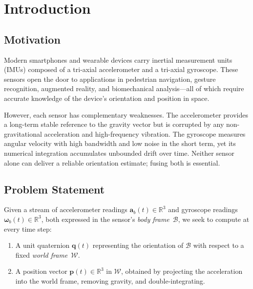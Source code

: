 \section{Introduction}
\label{sec:introduction}


\subsection{Motivation}
\label{sec:intro:motivation}

Modern smartphones and wearable devices carry inertial measurement units (IMUs)
composed of a tri-axial accelerometer and a tri-axial gyroscope. These sensors
open the door to applications in pedestrian navigation, gesture recognition,
augmented reality, and biomechanical analysis---all of which require accurate
knowledge of the device's orientation and position in space.

However, each sensor has complementary weaknesses. The accelerometer provides a
long-term stable reference to the gravity vector but is corrupted by any
non-gravitational acceleration and high-frequency vibration. The gyroscope
measures angular velocity with high bandwidth and low noise in the short term,
yet its numerical integration accumulates unbounded drift over time. Neither
sensor alone can deliver a reliable orientation estimate; fusing both is
essential.


\subsection{Problem Statement}
\label{sec:intro:problem}

Given a stream of accelerometer readings
$\mathbf{a}_b(t) \in \mathbb{R}^3$ and gyroscope readings
$\boldsymbol{\omega}_b(t) \in \mathbb{R}^3$, both expressed in the sensor's
\emph{body frame}~$\mathcal{B}$, we seek to compute at every time step:

\begin{enumerate}
  \item A unit quaternion $\mathbf{q}(t)$ representing the orientation of
        $\mathcal{B}$ with respect to a fixed \emph{world frame}~$\mathcal{W}$.
  \item A position vector $\mathbf{p}(t) \in \mathbb{R}^3$ in $\mathcal{W}$,
        obtained by projecting the acceleration into the world frame, removing
        gravity, and double-integrating.
\end{enumerate}

